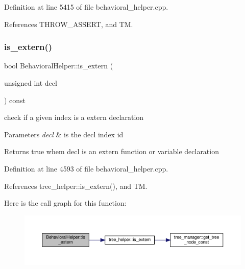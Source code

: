 Definition at line 5415 of file behavioral\+\_\+helper.\+cpp.



References T\+H\+R\+O\+W\+\_\+\+A\+S\+S\+E\+RT, and TM.

\mbox{\label{classBehavioralHelper_ab9b583a4859d91a0f4723df348938362}} 
\subsubsection{\texorpdfstring{is\+\_\+extern()}{is\_extern()}}
{\footnotesize\ttfamily bool Behavioral\+Helper\+::is\+\_\+extern (\begin{DoxyParamCaption}\item[{unsigned int}]{decl }\end{DoxyParamCaption}) const\hspace{0.3cm}{\ttfamily [virtual]}}



check if a given index is a extern declaration 


\begin{DoxyParams}{Parameters}
{\em decl} & is the decl index id \\
\hline
\end{DoxyParams}
\begin{DoxyReturn}{Returns}
true whem decl is an extern function or variable declaration 
\end{DoxyReturn}


Definition at line 4593 of file behavioral\+\_\+helper.\+cpp.



References tree\+\_\+helper\+::is\+\_\+extern(), and TM.

Here is the call graph for this function\+:
\nopagebreak
\begin{figure}[H]
\begin{center}
\leavevmode
\includegraphics[width=350pt]{dd/db2/classBehavioralHelper_ab9b583a4859d91a0f4723df348938362_cgraph}
\end{center}
\end{figure}
\mbox{\label{classBehavioralHelper_abad4a8f3a5f0846bc2b10b3da91dd423}} 
